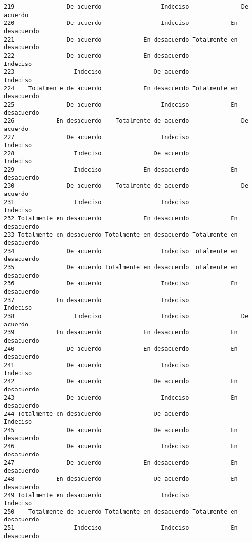 \documentclass[
  letterpaper,
  DIV=11,
  numbers=noendperiod]{scrartcl}
\begin{document}
\begin{verbatim}
219               De acuerdo                 Indeciso               De acuerdo
220               De acuerdo                 Indeciso            En desacuerdo
221               De acuerdo            En desacuerdo Totalmente en desacuerdo
222               De acuerdo            En desacuerdo                 Indeciso
223                 Indeciso               De acuerdo                 Indeciso
224    Totalmente de acuerdo            En desacuerdo Totalmente en desacuerdo
225               De acuerdo                 Indeciso            En desacuerdo
226            En desacuerdo    Totalmente de acuerdo               De acuerdo
227               De acuerdo                 Indeciso                 Indeciso
228                 Indeciso               De acuerdo                 Indeciso
229                 Indeciso            En desacuerdo            En desacuerdo
230               De acuerdo    Totalmente de acuerdo               De acuerdo
231                 Indeciso                 Indeciso                 Indeciso
232 Totalmente en desacuerdo            En desacuerdo            En desacuerdo
233 Totalmente en desacuerdo Totalmente en desacuerdo Totalmente en desacuerdo
234               De acuerdo                 Indeciso Totalmente en desacuerdo
235               De acuerdo Totalmente en desacuerdo Totalmente en desacuerdo
236               De acuerdo                 Indeciso            En desacuerdo
237            En desacuerdo                 Indeciso                 Indeciso
238                 Indeciso                 Indeciso               De acuerdo
239            En desacuerdo            En desacuerdo            En desacuerdo
240               De acuerdo            En desacuerdo            En desacuerdo
241               De acuerdo                 Indeciso                 Indeciso
242               De acuerdo               De acuerdo            En desacuerdo
243               De acuerdo                 Indeciso            En desacuerdo
244 Totalmente en desacuerdo               De acuerdo                 Indeciso
245               De acuerdo               De acuerdo            En desacuerdo
246               De acuerdo                 Indeciso            En desacuerdo
247               De acuerdo            En desacuerdo            En desacuerdo
248            En desacuerdo               De acuerdo            En desacuerdo
249 Totalmente en desacuerdo                 Indeciso                 Indeciso
250    Totalmente de acuerdo Totalmente en desacuerdo Totalmente en desacuerdo
251                 Indeciso                 Indeciso            En desacuerdo

\end{verbatim}
\end{document}
